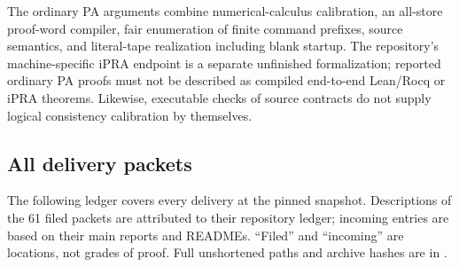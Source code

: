 The ordinary PA arguments combine numerical-calculus calibration, an all-store
proof-word compiler, fair enumeration of finite command prefixes, source
semantics, and literal-tape realization including blank startup. The repository's
machine-specific iPRA endpoint is a separate unfinished formalization; reported
ordinary PA proofs must not be described as compiled end-to-end Lean/Rocq
or iPRA theorems. Likewise, executable checks of source contracts do not supply
logical consistency calibration by themselves.

\subsection{All delivery packets}
The following ledger covers every delivery at the pinned snapshot. Descriptions
of the 61 filed packets are attributed to their repository ledger; incoming
entries are based on their main reports and READMEs. ``Filed'' and ``incoming''
are locations, not grades of proof. Full unshortened paths and archive hashes
are in .
\begingroup\scriptsize
